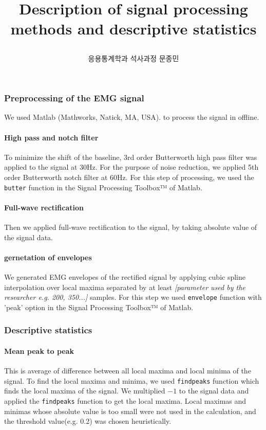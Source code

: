 \documentclass[a4papaer, 11pt]{article}
\begin{document}
\title{Description of signal processing methods and descriptive statistics
\author{응용통계학과 석사과정 문종민\\
}
}


\maketitle
\subsubsection{Preprocessing of the EMG signal}

We used Matlab
(Mathworks, Natick, MA, USA).
to process the signal in offline.

\paragraph{High pass and notch filter}
To minimize the shift of the baseline,
3rd order Butterworth high pass filter was applied to the signal at 30Hz.
For the purpose of noise reduction,
we applied 5th order Butterworth notch filter at 60Hz.
For this step of processing,
we used the \texttt{butter} function in the Signal Processing Toolbox™ of Matlab.

\paragraph{Full-wave rectification}
Then we applied full-wave rectification to the signal, by taking absolute value of the signal data.

\paragraph{gernetation of envelopes}
We generated EMG envelopes of the rectified signal
by applying cubic spline interpolation over local maxima separated by at least \textit{[parameter used by the researcher e.g. 200, 350...]} samples. For this step we used \texttt{envelope} function with 'peak' option in the Signal Processing Toolbox™ of Matlab.


\subsubsection{Descriptive statistics}

\paragraph{Mean peak to peak}
This is average of difference between all local maxima and local minima of the signal. To find the local maxima and minima, we used \texttt{findpeaks} function which finds the local maxima of the signal. We multiplied $-1$ to the signal data and applied the \texttt{findpeaks} function to get the local maxima. Local maximas and minimas whose absolute value is too small were not used in the calculation, and the threshold value(e.g. 0.2) was chosen heuristically.
\end{document}
